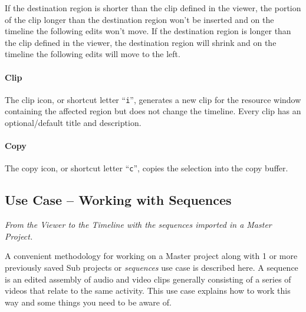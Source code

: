 If the destination region is shorter than the clip defined in the
viewer, the portion of the clip longer than the destination region
won't be inserted and on the timeline the following edits won't
move.  If the destination region is longer than the clip defined in
the viewer, the destination region will shrink and on the timeline
the following edits will move to the left.

\paragraph{Clip} The clip icon, or shortcut letter “\texttt{i}”,
generates a new clip for the resource window containing the affected
region but does not change the timeline.  Every clip has an
optional/default title and description.

\paragraph{Copy} The copy icon, or shortcut letter “\texttt{c}”,
copies the selection into the copy buffer.

\subsection{Use Case – Working with Sequences}
\label{sub:use_case_working_sequences}

\textit{From the Viewer to the Timeline  with the sequences imported
  in a Master Project.}

A convenient methodology for working on a Master project along with
1 or more previously saved Sub projects or \textit{sequences} use
case is described here.  A sequence is an edited assembly of audio
and video clips generally consisting of a series of videos that
relate to the same activity. This use case explains how to work this
way and some things you need to be aware of.

